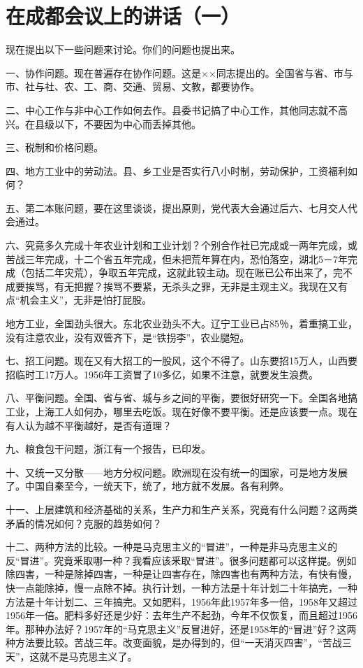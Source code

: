 \section[在成都会议上的讲话（一）（一九五八年三月九日）]{在成都会议上的讲话（一）}


现在提出以下一些问题来讨论。你们的问题也提出来。

一、协作问题。现在普遍存在协作问题。这是××同志提出的。全国省与省、市与市、社与社、农、工、商、交通、贸易、文教，都要协作。

二、中心工作与非中心工作如何去作。县委书记搞了中心工作，其他同志就不高兴。在县级以下，不要因为中心而丢掉其他。

三、税制和价格问题。

四、地方工业中的劳动法。县、乡工业是否实行八小时制，劳动保护，工资福利如何？

五、第二本账问题，要在这里谈谈，提出原则，党代表大会通过后六、七月交人代会通过。

六、究竟多久完成十年农业计划和工业计划？个别合作社已完成或一两年完成，或苦战三年完成，十二个省五年完成，但未把荒年算在内，恐怕落空，湖北5－7年完成（包括二年灾荒），争取五年完成，这就此较主动。现在账已公布出来了，完不成要挨骂，有无把握？挨骂不要紧，无杀头之罪，无非是主观主义。我现在又有点“机会主义”，无非是怕打屁股。

地方工业，全国劲头很大。东北农业劲头不大。辽宁工业已占85％，着重搞工业，没有注意农业，没有双管齐下，是“铁拐李”，农业腿短。

七、招工问题。现在又有大招工的一股风，这个不得了。山东要招15万人，山西要招临时工17万人。1956年工资冒了10多亿，如果不注意，就要发生浪费。

八、平衡问题。全国、省与省、城与乡之间的平衡，要很好研究一下。全国各地搞工业，上海工人如何办，哪里去吃饭。现在好像不要平衡。还是应该要一点。现在有人认为越不平衡越好，是否有道理？

九、粮食包干问题，浙江有一个报告，已印发。

十、又统一又分散——地方分权问题。欧洲现在没有统一的国家，可是地方发展了。中国自秦至今，一统天下，统了，地方就不发展。各有利弊。

十一、上层建筑和经济基础的关系，生产力和生产关系，究竟有什么问题？这两类矛盾的情况如何？克服的趋势如何？

十二、两种方法的比较。一种是马克思主义的“冒进”，一种是非马克思主义的反“冒进”。究竟釆取哪一种？我看应该釆取“冒进”。很多问题都可以这样提。例如除四害，一种是除掉四害，一种是让四害存在，除四害也有两种方法，有快有慢，快一点能除掉，慢一点除不掉。执行计划，一种方法是十年计划二十年搞完，一种方法是十年计划二、三年搞完。又如肥料，1956年此1957年多一倍，1958年又超过1956年一倍。肥料多好还是少好：去年生产不起劲，今年不仅恢复，而且超过1956年。那种办法好？1957年的“马克思主义”反冒进好，还是1958年的“冒进”好？这两种方法要比较。苦战三年。改变面貌，是办得到的，但“一天消灭四害”，“苦战三天”，这就不是马克思主义了。

